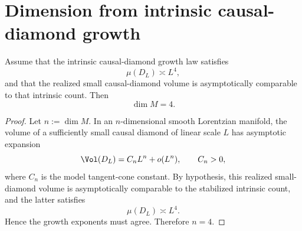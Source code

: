 \section{Dimension from intrinsic causal-diamond growth}
\label{sec:einstein-dim}
\begin{theorem}
	\label{thm:einstein-dim}
	Assume that the intrinsic causal-diamond growth law satisfies
	\[
		\mu(D_L)\asymp L^4,
	\]
	and that the realized small causal-diamond volume is asymptotically
	comparable to that intrinsic count.
	Then
	\[
		\dim M=4.
	\]
\end{theorem}
\begin{proof}
	Let \(n:=\dim M\).
	In an \(n\)-dimensional smooth Lorentzian manifold, the volume of a
	sufficiently small causal diamond of linear scale \(L\) has asymptotic
	expansion
	\[
		\Vol(D_L)=C_nL^n+o(L^n),
		\qquad
		C_n>0,
	\]
	where \(C_n\) is the model tangent-cone constant.
	By hypothesis, this realized small-diamond volume is asymptotically
	comparable to the stabilized intrinsic count, and the latter satisfies
	\[
		\mu(D_L)\asymp L^4.
	\]
	Hence the growth exponents must agree.
	Therefore \(n=4\).
\end{proof}
